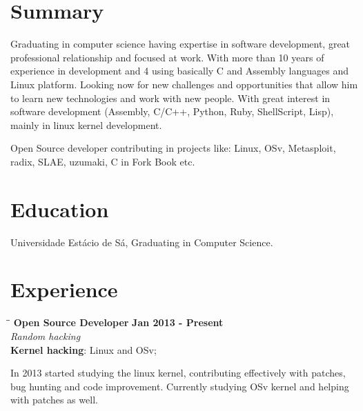 \documentclass[margin]{res}
\begin{document}

\address{Juazeiro do Norte, Brazil \\ \href{mailto:geyslan@gmail.com}{geyslan@gmail.com} \\ Phone: 55 88 9617 0441 \\ Postal Code: 63034-100 }


\begin{resume}

\section{Summary}  Graduating in computer science having expertise in software development, great professional relationship
                        and focused at work. With more than 10 years of experience in development and 4 using basically C and
                        Assembly languages and Linux platform. Looking now for new challenges and opportunities that allow him to learn
                        new technologies and work with new people. With great interest in software development (Assembly, C/C++, Python,
                        Ruby, ShellScript, Lisp), mainly in linux kernel development.

                        Open Source developer contributing in projects like: Linux, OSv, Metasploit, radix, SLAE, uzumaki,
                        C in Fork Book etc.

\section{Education}	Universidade Estácio de Sá, Graduating in Computer Science.

\section{Experience}

\vspace{-0.1in}
   \begin{tabbing}
   \hspace{2.3in}\= \hspace{1.7in}\= \kill %
    \textbf{Open Source Developer}    \>\>\textbf{Jan 2013 - Present}\\
    \textit{Random hacking}\\
    \textbf{Kernel hacking}: Linux and OSv;
   \end{tabbing}\vspace{-20pt}      %
    \vspace{2mm}
    In 2013 started studying the linux kernel, contributing effectively with patches, bug hunting and code improvement.
    Currently studying OSv kernel and helping with patches as well.


\end{resume}
\end{document}
